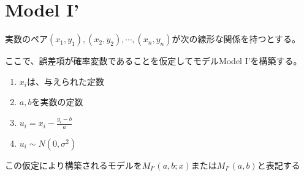 \fi

\section{Model I'}
実数のペア$(x_1,y_1),(x_2,y_2),\cdots,(x_n,y_n)$が次の線形な関係を持つとする。

ここで、誤差項が確率変数であることを仮定してモデルModel I'を構築する。
\begin{enumerate}
 \item $x_i$は、与えられた定数
 \item $a,b$を実数の定数
 \item $u_i = x_i -\frac{y_i-b}{a}$
 \item $u_i \sim N(0,\sigma^2)$
\end{enumerate}
この仮定により構築されるモデルを$M_{I'}(a,b; x)$または$M_{I'}(a,b)$と表記する

